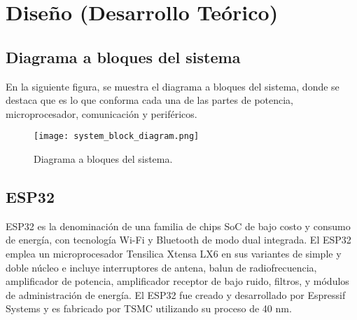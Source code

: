 \section{Diseño (Desarrollo Teórico)}
\subsection{Diagrama a bloques del sistema}
En la siguiente figura, se muestra el diagrama a bloques del sistema, donde se destaca que es lo que
conforma cada una de las partes de potencia, microprocesador, comunicación y periféricos.
\begin{figure}[htp]
    \centering
    \texttt{[image: system\_block\_diagram.png]}
    \caption{Diagrama a bloques del sistema.}
\end{figure}

\subsection{ESP32}
ESP32 es la denominación de una familia de chips SoC de bajo costo y consumo de energía, con tecnología Wi-Fi
y Bluetooth de modo dual integrada. El ESP32 emplea un microprocesador Tensilica Xtensa LX6 en sus variantes
de simple y doble núcleo e incluye interruptores de antena, balun de radiofrecuencia, amplificador de potencia,
amplificador receptor de bajo ruido, filtros, y módulos de administración de energía. El ESP32 fue creado y
desarrollado por Espressif Systems y es fabricado por TSMC utilizando su proceso de 40 nm.

